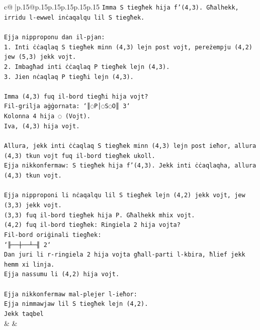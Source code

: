 \documentclass{article}
\begin{document}
{\begin{supertabular}{c@{$\;$}|p{.15\linewidth}@{}p{.15\linewidth}p{.15\linewidth}p{.15\linewidth}p{.15\linewidth}p{.15\linewidth}}
{{{\texttt{Imma S tiegħek hija f'(4,3). Għalhekk, irridu l{-}ewwel inċaqalqu lil S tiegħek.} \\
\\ 
\texttt{Ejja nipproponu dan il{-}pjan:} \\
\texttt{1. Inti ċċaqlaq S tiegħek minn (4,3) lejn post vojt, pereżempju (4,2) jew (5,3) jekk vojt.} \\
\texttt{2. Imbagħad inti ċċaqlaq P tiegħek lejn (4,3).} \\
\texttt{3. Jien nċaqlaq P tiegħi lejn (4,3).} \\
\\ 
\texttt{Imma (4,3) fuq il{-}bord tiegħi hija vojt?} \\
\texttt{Fil{-}grilja aġġornata: `║◌P│◌S◌O║ 3`} \\
\texttt{Kolonna 4 hija ◌ (Vojt).} \\
\texttt{Iva, (4,3) hija vojt.} \\
\\ 
\texttt{Allura, jekk inti ċċaqlaq S tiegħek minn (4,3) lejn post ieħor, allura (4,3) tkun vojt fuq il{-}bord tiegħek ukoll.} \\
\texttt{Ejja nikkonfermaw: S tiegħek hija f'(4,3). Jekk inti ċċaqlaqha, allura (4,3) tkun vojt.} \\
\\ 
\texttt{Ejja nipproponi li nċaqalqu lil S tiegħek lejn (4,2) jekk vojt, jew (3,3) jekk vojt.} \\
\texttt{(3,3) fuq il{-}bord tiegħek hija P. Għalhekk mhix vojt.} \\
\texttt{(4,2) fuq il{-}bord tiegħek: Ringiela 2 hija vojta?} \\
\texttt{Fil{-}bord oriġinali tiegħek:} \\
\texttt{`╟──┼──┴─╢ 2`} \\
\texttt{Dan juri li r{-}ringiela 2 hija vojta għall{-}parti l{-}kbira, ħlief jekk hemm xi linja.} \\
\texttt{Ejja nassumu li (4,2) hija vojt.} \\
\\ 
\texttt{Ejja nikkonfermaw mal{-}plejer l{-}ieħor:} \\
\texttt{Ejja nimmawjaw lil S tiegħek lejn (4,2).} \\
\texttt{Jekk taqbel} \\
            }
        }
    }
    & & \\ \\


\end{supertabular}}
\end{document}
